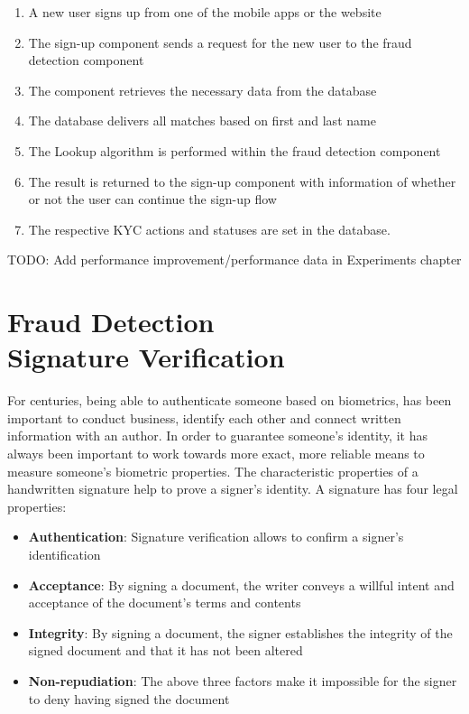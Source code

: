 \documentclass[a4paper, oneside]{csthesis}
\begin{document}
\begin{enumerate}
\item A new user signs up from one of the mobile apps or the website
\item The sign-up component sends a request for the new user to the fraud detection component
\item The component retrieves the necessary data from the database
\item The database delivers all matches based on first and last name
\item The Lookup algorithm is performed within the fraud detection component
\item The result is returned to the sign-up component with information of whether or not the user can continue the sign-up flow
\item The respective KYC actions and statuses are set in the database.
\end{enumerate}

TODO: Add performance improvement/performance data in Experiments chapter













\chapter{Fraud Detection \\Signature Verification}
\label{chp:signature-verification}

For centuries, being able to authenticate someone based on biometrics, has been important to conduct business, identify each other and connect written information with an author. In order to guarantee someone's identity, it has always been important to work towards more exact, more reliable means to measure someone's biometric properties. The characteristic properties of a handwritten signature help to prove a signer's identity. A signature has four legal properties: \cite{Hanmandlu05}

\begin{itemize}
\item \textbf{Authentication}: Signature verification allows to confirm a signer's identification
\item \textbf{Acceptance}: By signing a document, the writer conveys a willful intent and acceptance of the document's terms and contents
\item \textbf{Integrity}: By signing a document, the signer establishes the integrity of the signed document and that it has not been altered
\item \textbf{Non-repudiation}: The above three factors make it impossible for the signer to deny having signed the document
\end{itemize}
\end{document}
